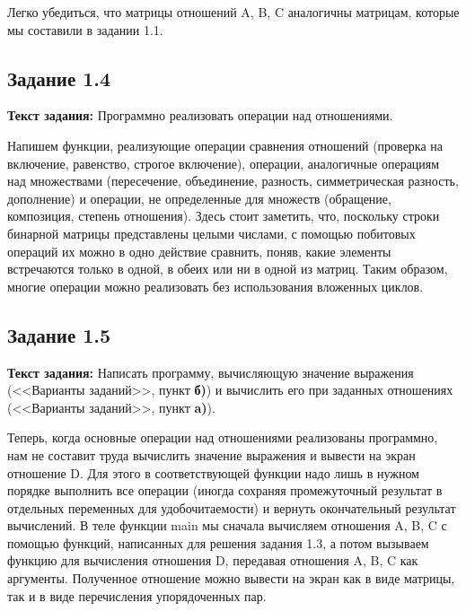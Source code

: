 \documentclass[12pt]{article}
\begin{document}
	Легко убедиться, что матрицы отношений A, B, C аналогичны матрицам, которые мы составили в задании 1.1.
	
	\subsection{Задание 1.4}
	\label{subpart1_4}
	
	{\bf Текст задания:} Программно реализовать операции над отношениями.
	
	Напишем функции, реализующие операции сравнения отношений (проверка на включение, равенство, строгое включение), операции, аналогичные операциям над множествами (пересечение, объединение, разность, симметрическая разность, дополнение) и операции, не определенные для множеств (обращение, композиция, степень отношения). Здесь стоит заметить, что, поскольку  строки бинарной матрицы представлены целыми числами, с помощью побитовых операций их можно в одно действие сравнить, поняв, какие элементы встречаются только в одной, в обеих или ни в одной из матриц. Таким образом, многие операции можно реализовать без использования вложенных циклов.
	
	 
	
	\subsection{Задание 1.5}
	\label{subpart1_5}
	
	{\bf Текст задания:} Написать программу, вычисляющую значение выражения (<<Варианты заданий>>, пункт {\bf б)}) и вычислить его при заданных отношениях (<<Варианты заданий>>, пункт {\bf a)}).
	
	Теперь, когда основные операции над отношениями реализованы программно, нам не составит труда вычислить значение выражения и вывести на экран отношение D. Для этого в соответствующей функции надо лишь в нужном порядке выполнить все операции (иногда сохраняя промежуточный результат в отдельных переменных для удобочитаемости) и вернуть окончательный результат вычислений. В теле функции main мы сначала вычисляем отношения A, B, C с помощью функций, написанных для решения задания 1.3, а потом вызываем функцию для вычисления отношения D, передавая отношения A, B, C как аргументы. Полученное отношение можно вывести на экран как в виде матрицы, так и в виде перечисления упорядоченных пар.
	
	 
	\newpage
	
\end{document}
